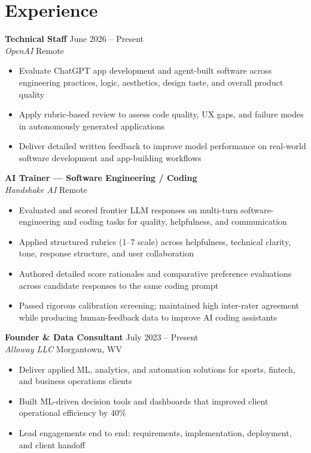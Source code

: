 \documentclass[11pt,letterpaper]{article}
\newcommand{\resumeitem}[1]{\item[\textbullet] #1}
\begin{document}
\section{Experience}

\textbf{Technical Staff} \hfill June 2026 -- Present \\
\textit{OpenAI} \hfill Remote
\begin{itemize}[nosep, leftmargin=16pt, topsep=2pt]
    \resumeitem{Evaluate ChatGPT app development and agent-built software across engineering practices, logic, aesthetics, design taste, and overall product quality}
    \resumeitem{Apply rubric-based review to assess code quality, UX gaps, and failure modes in autonomously generated applications}
    \resumeitem{Deliver detailed written feedback to improve model performance on real-world software development and app-building workflows}
\end{itemize}

\vspace{4pt}

\textbf{AI Trainer --- Software Engineering / Coding} \\
\textit{Handshake AI} \hfill Remote
\begin{itemize}[nosep, leftmargin=16pt, topsep=2pt]
    \resumeitem{Evaluated and scored frontier LLM responses on multi-turn software-engineering and coding tasks for quality, helpfulness, and communication}
    \resumeitem{Applied structured rubrics (1--7 scale) across helpfulness, technical clarity, tone, response structure, and user collaboration}
    \resumeitem{Authored detailed score rationales and comparative preference evaluations across candidate responses to the same coding prompt}
    \resumeitem{Passed rigorous calibration screening; maintained high inter-rater agreement while producing human-feedback data to improve AI coding assistants}
\end{itemize}

\vspace{4pt}

\textbf{Founder \& Data Consultant} \hfill July 2023 -- Present \\
\textit{Alloway LLC} \hfill Morgantown, WV
\begin{itemize}[nosep, leftmargin=16pt, topsep=2pt]
    \resumeitem{Deliver applied ML, analytics, and automation solutions for sports, fintech, and business operations clients}
    \resumeitem{Built ML-driven decision tools and dashboards that improved client operational efficiency by 40\%}
    \resumeitem{Lead engagements end to end: requirements, implementation, deployment, and client handoff}
\end{itemize}
\end{document}
